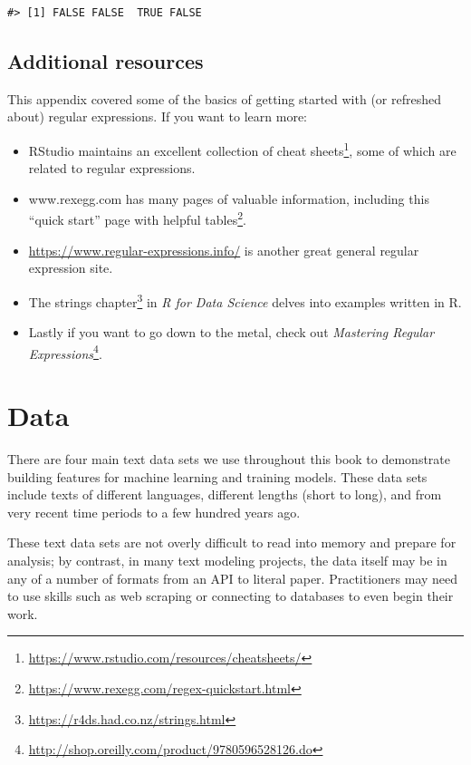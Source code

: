 \documentclass[
]{krantz}
\DeclareRobustCommand{\href}[2]{#2\footnote{\url{#1}}}
\renewcommand{\href}[2]{#2\footnote{\url{#1}}}
\begin{document}
\begin{verbatim}
#> [1] FALSE FALSE  TRUE FALSE
\end{verbatim}

\hypertarget{additional-resources}{%
\section{Additional resources}\label{additional-resources}}

This appendix covered some of the basics of getting started with (or refreshed about) regular expressions. If you want to learn more:

\begin{itemize}
\item
  RStudio maintains \href{https://www.rstudio.com/resources/cheatsheets/}{an excellent collection of cheat sheets}, some of which are related to regular expressions.
\item
  www.rexegg.com has many pages of valuable information, including \href{https://www.rexegg.com/regex-quickstart.html}{this ``quick start'' page with helpful tables}.
\item
  \url{https://www.regular-expressions.info/} is another great general regular expression site.
\item
  The \href{https://r4ds.had.co.nz/strings.html}{strings chapter} in \emph{R for Data Science} \citep{Wickham2017} delves into examples written in R.
\item
  Lastly if you want to go down to the metal, check out \href{http://shop.oreilly.com/product/9780596528126.do}{\emph{Mastering Regular Expressions}}.
\end{itemize}

\hypertarget{appendixdata}{%
\chapter{Data}\label{appendixdata}}

There are four main text data sets we use throughout this book to demonstrate building features for machine learning and training models. These data sets include texts of different languages, different lengths (short to long), and from very recent time periods to a few hundred years ago.

These text data sets are not overly difficult to read into memory and prepare for analysis; by contrast, in many text modeling projects, the data itself may be in any of a number of formats from an API to literal paper. Practitioners may need to use skills such as web scraping or connecting to databases to even begin their work.
\end{document}
